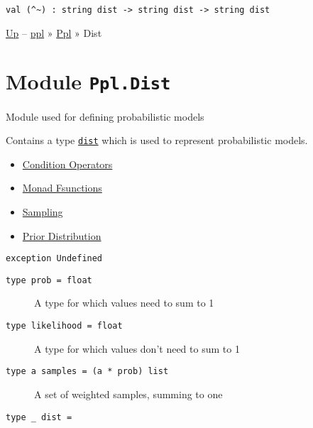 \protect\hyperlink{val-ux28ux5cux255Eux7eux29}{}\texttt{val\ (\^{}\textasciitilde{})\ :\ string\ dist\ -\textgreater{}\ string\ dist\ -\textgreater{}\ string\ dist}

\href{../index.html}{Up} -- \href{../../index.html}{ppl} »
\href{../index.html}{Ppl} » Dist

\section{\texorpdfstring{Module
\texttt{Ppl.Dist}}{Module Ppl.Dist}}\label{module-ppl.dist}

Module used for defining probabilistic models

Contains a type \href{index.html\#type-dist}{\texttt{dist}} which is
used to represent probabilistic models.

\begin{itemize}
\tightlist
\item
  \protect\hyperlink{distux5fmonad}{Condition Operators}
\item
  \protect\hyperlink{distux5fmonad}{Monad Fsunctions}
\item
  \protect\hyperlink{distux5fsample}{Sampling}
\item
  \protect\hyperlink{prior}{Prior Distribution}
\end{itemize}

\protect\hyperlink{exception-Undefined}{}\texttt{exception\ }\texttt{Undefined}

\begin{description}
\item[{\protect\hyperlink{type-prob}{}\texttt{type\ prob}\texttt{\ =\ float}}]
A type for which values need to sum to 1
\end{description}

\begin{description}
\item[{\protect\hyperlink{type-likelihood}{}\texttt{type\ likelihood}\texttt{\ =\ float}}]
A type for which values don't need to sum to 1
\end{description}

\begin{description}
\item[{\protect\hyperlink{type-samples}{}\texttt{type\ \textquotesingle{}a\ samples}\texttt{\ =\ (\textquotesingle{}a\ *\ prob)\ list}}]
A set of weighted samples, summing to one
\end{description}

\protect\hyperlink{type-dist}{}\texttt{type\ \_\ dist}\texttt{\ =\ }

